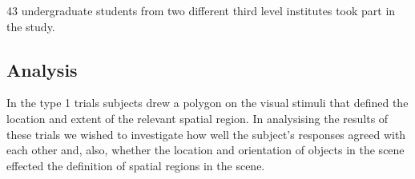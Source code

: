 \documentclass[11pt,letterpaper]{article}
\begin{document}
43 undergraduate students from two different third level institutes took part in the study. 

\subsection{Analysis}


In the type 1 trials subjects drew a polygon on the visual stimuli that defined the location and extent of the relevant spatial region. In analysising the results of these trials we wished to investigate how well the subject's responses agreed with each other and, also, whether the location and orientation of objects in the scene effected the definition of spatial regions in the scene. 
\end{document}
